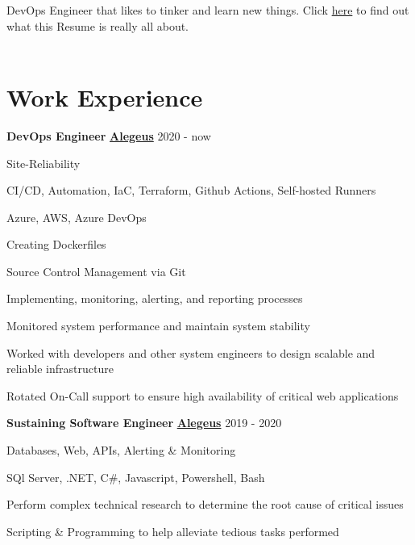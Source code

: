 \documentclass[a4paper]{mctemplate} %
\begin{document}

\begin{main}


{DevOps Engineer that likes to tinker and learn new things. Click \href{https://github.com/brandoneto/resume} {here} to find out what this Resume is really all about.} \\ \\
\section{Work Experience}


    {{\textbf{DevOps Engineer}} \hfill \footnotesize{\href{https://www.alegeus.com/}{\textbf{Alegeus}} 2020 - now}}

\begin{itemize}[noitemsep]
    {
        \item Site-Reliability
        \item CI/CD, Automation, IaC, Terraform, Github Actions, Self-hosted Runners
        \item Azure, AWS, Azure DevOps
        \item Creating Dockerfiles
        \item Source Control Management via Git
        \item Implementing, monitoring, alerting, and reporting processes
        \item Monitored system performance and maintain system stability
        \item Worked with developers and other system engineers to design scalable and reliable infrastructure
        \item Rotated On-Call support to ensure high availability of critical web applications
    }
\end{itemize}

    {{\textbf{Sustaining Software Engineer}} \hfill \footnotesize{\href{https://www.alegeus.com/}{\textbf{Alegeus}} 2019 - 2020}}

\begin{itemize}[noitemsep]
    {
        \item Databases, Web, APIs, Alerting \& Monitoring 
        \item SQl Server, .NET, C\#, Javascript, Powershell, Bash 
        \item Perform complex technical research to determine the root cause of critical issues
        \item Scripting \& Programming to help alleviate tedious tasks performed
    }
\end{itemize}


\end{main}
\end{document}
